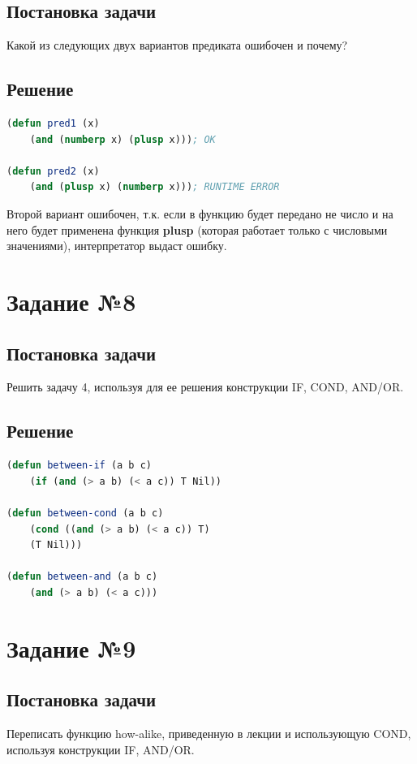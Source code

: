 \documentclass[12pt]{report}
\begin{document}
\subsection*{Постановка задачи}
Какой из следующих двух вариантов предиката ошибочен и почему? 

\subsection*{Решение}
\begin{lstlisting}[label=7,caption=Решение задания №7, language=lisp]
(defun pred1 (x)
	(and (numberp x) (plusp x))); OK
	
(defun pred2 (x)
	(and (plusp x) (numberp x))); RUNTIME ERROR
\end{lstlisting}

Второй вариант ошибочен, т.к. если в функцию будет передано не число и на него будет применена функция \textbf{plusp} (которая работает только с числовыми значениями), интерпретатор выдаст ошибку.

\section*{Задание №8}
\subsection*{Постановка задачи}
Решить задачу 4, используя для ее решения конструкции IF, COND, AND/OR.

\subsection*{Решение}
\begin{lstlisting}[label=8,caption=Решение задания №8, language=lisp]
(defun between-if (a b c)
	(if (and (> a b) (< a c)) T Nil))

(defun between-cond (a b c)
	(cond ((and (> a b) (< a c)) T)
	(T Nil)))

(defun between-and (a b c)
	(and (> a b) (< a c)))
\end{lstlisting}


\section*{Задание №9}
\subsection*{Постановка задачи}
Переписать функцию how-alike, приведенную в лекции и использующую COND, используя конструкции IF, AND/OR.
\end{document}
